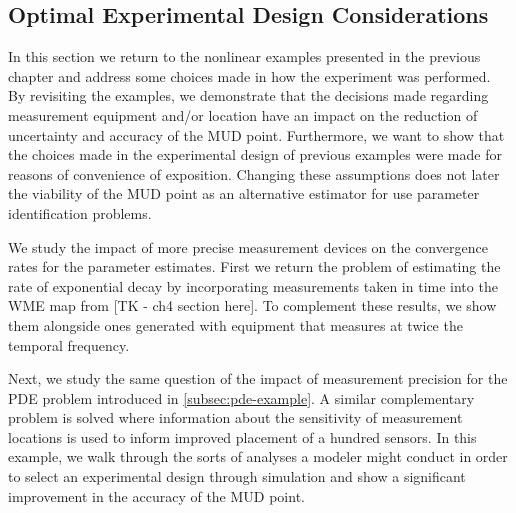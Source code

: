 \subsection{Optimal Experimental Design Considerations}

In this section we return to the nonlinear examples presented in the previous chapter and address some choices made in how the experiment was performed.
By revisiting the examples, we demonstrate that the decisions made regarding measurement equipment and/or location have an impact on the reduction of uncertainty and accuracy of the MUD point.
Furthermore, we want to show that the choices made in the experimental design of previous examples were made for reasons of convenience of exposition.
Changing these assumptions does not later the viability of the MUD point as an alternative estimator for use parameter identification problems.

We study the impact of more precise measurement devices on the convergence rates for the parameter estimates.
First we return the problem of estimating the rate of exponential decay by incorporating measurements taken in time into the WME map from [TK - ch4 section here].
To complement these results, we show them alongside ones generated with equipment that measures at twice the temporal frequency.

Next, we study the same question of the impact of measurement precision for the PDE problem introduced in \ref{subsec:pde-example}.
A similar complementary problem is solved where information about the sensitivity of measurement locations is used to inform improved placement of a hundred sensors.
In this example, we walk through the sorts of analyses a modeler might conduct in order to select an experimental design through simulation and show a significant improvement in the accuracy of the MUD point.


\FloatBarrier
